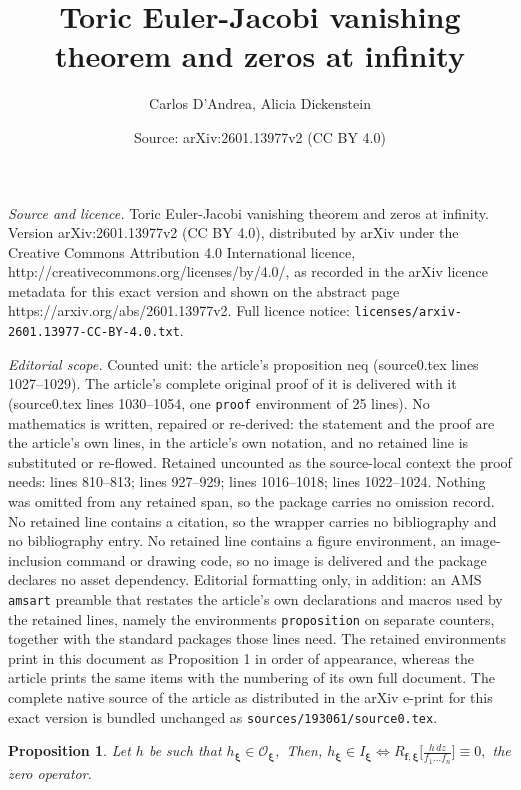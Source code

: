 \documentclass[10pt,a4paper]{amsart}
\title{Toric Euler-Jacobi vanishing theorem and zeros at infinity}
\author{Carlos D'Andrea, Alicia Dickenstein}
\date{Source: arXiv:2601.13977v2 (CC BY 4.0)}
\newtheorem{proposition}{Proposition}
\newcommand{\bff}{{\boldsymbol{f}}}
\newcommand{\bfxi}{{\boldsymbol{\xi}}}
\newcommand{\cO}{{\mathcal O}}
\begin{document}
\maketitle

\noindent\emph{Source and licence.} Toric Euler-Jacobi vanishing theorem and zeros at infinity. Version arXiv:2601.13977v2 (CC BY 4.0), distributed by arXiv under the Creative Commons Attribution 4.0 International licence, http://creativecommons.org/licenses/by/4.0/, as recorded in the arXiv licence metadata for this exact version and shown on the abstract page https://arxiv.org/abs/2601.13977v2. Full licence notice: \texttt{licenses/arxiv-2601.13977-CC-BY-4.0.txt}.\par\smallskip

\noindent\textit{Editorial scope.} Counted unit: the article's proposition neq (source0.tex lines 1027--1029). The article's complete original proof of it is delivered with it (source0.tex lines 1030--1054, one \texttt{proof} environment of 25 lines). No mathematics is written, repaired or re-derived: the statement and the proof are the article's own lines, in the article's own notation, and no retained line is substituted or re-flowed.  Retained uncounted as the source-local context the proof needs: lines 810--813; lines 927--929; lines 1016--1018; lines 1022--1024.  Nothing was omitted from any retained span, so the package carries no omission record.  No retained line contains a citation, so the wrapper carries no bibliography and no bibliography entry.  No retained line contains a figure environment, an image-inclusion command or drawing code, so no image is delivered and the package declares no asset dependency.  Editorial formatting only, in addition: an AMS \texttt{amsart} preamble that restates the article's own declarations and macros used by the retained lines, namely the environments \texttt{proposition} on separate counters, together with the standard packages those lines need.  The retained environments print in this document as Proposition 1 in order of appearance, whereas the article prints the same items with the numbering of its own full document.  The complete native source of the article as distributed in the arXiv e-print for this exact version is bundled unchanged as \texttt{sources/193061/source0.tex}.
\begin{proposition}\label{lresid}
Let $h$ be such that $h_\bfxi\in\cO_\bfxi,$ Then,
 $h_\bfxi\in I_\bfxi\iff R_{\bff, \bfxi}\big[\frac{h\,dz}{f_1\ldots f_n}\big]\equiv0,$ the zero operator. 
\end{proposition}
\end{document}
